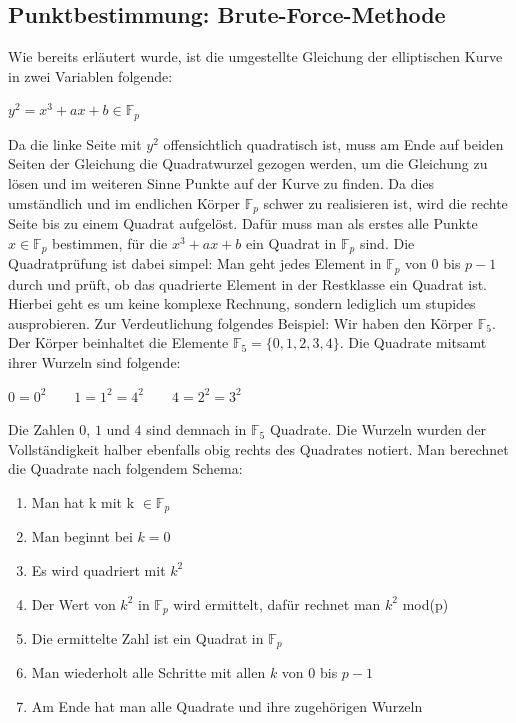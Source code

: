 \subsection{Punktbestimmung: Brute-Force-Methode}\label{sec:brute_force}
Wie bereits erläutert wurde, ist die umgestellte Gleichung der elliptischen Kurve in zwei Variablen folgende:
\begin{center}
$y^{2} =  x^{3} + ax + b  \in \mathbb{F}_{p}$
\end{center}

Da die linke Seite mit $y^{2}$ offensichtlich quadratisch ist, muss am Ende auf beiden Seiten der Gleichung die Quadratwurzel gezogen werden, um die Gleichung zu lösen und im weiteren Sinne Punkte auf der Kurve zu finden. Da dies umständlich und im endlichen Körper $\mathbb{F}_{p}$ schwer zu realisieren ist, wird die rechte Seite bis zu einem Quadrat aufgelöst. Dafür muss man als erstes alle Punkte $x \in \mathbb{F}_{p}$ bestimmen, für die $x^{3} + ax + b$ ein Quadrat in $\mathbb{F}_{p}$ sind. Die Quadratprüfung ist dabei simpel: Man geht jedes Element in $\mathbb{F}_{p}$ von $0$ bis $p - 1$ durch und prüft, ob das quadrierte Element in der Restklasse ein Quadrat ist. Hierbei geht es um keine komplexe Rechnung, sondern lediglich um stupides ausprobieren. Zur Verdeutlichung folgendes Beispiel: Wir haben den Körper $\mathbb{F}_{5}$. Der Körper beinhaltet die Elemente $\mathbb{F}_{5} = \{0, 1, 2, 3, 4\}$. Die Quadrate mitsamt ihrer Wurzeln sind folgende:
\begin{center}
$0 = 0^{2} \qquad 1 = 1^{2} = 4^{2} \qquad 4 = 2^{2} = 3^{2}$
\end{center}

Die Zahlen $0$, $1$ und $4$ sind demnach in $\mathbb{F}_{5}$ Quadrate. Die Wurzeln wurden der Vollständigkeit halber ebenfalls obig rechts des Quadrates notiert. Man berechnet die Quadrate nach folgendem Schema:

\begin{enumerate}
\item Man hat k mit k $\in \mathbb{F}_{p}$
\item Man beginnt bei $k = 0$
\item Es wird quadriert mit $k^{2}$
\item Der Wert von $k^{2}$ in $\mathbb{F}_{p}$ wird ermittelt, dafür rechnet man $k^{2}$ mod(p)
\item Die ermittelte Zahl ist ein Quadrat in $\mathbb{F}_{p}$
\item Man wiederholt alle Schritte mit allen $k$ von $0$ bis $p - 1$
\item Am Ende hat man alle Quadrate und ihre zugehörigen Wurzeln
\end{enumerate}

